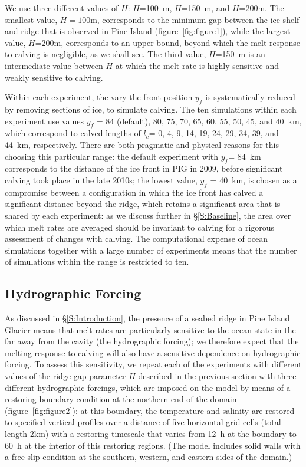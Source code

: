 \documentclass[draft]{agujournal2019}
\begin{document}
We use three different values of $H$: $H$=100~m, $H$=150~m, and $H$=200m. The smallest value, $H = 100$m, corresponds to the minimum gap between the ice shelf and ridge that is observed in Pine Island (figure~\ref{fig:figure1}), while the largest value, $H$=200m, corresponds to an upper bound, beyond which the melt response to calving is negligible, as we shall see. The third value, $H$=150~m is an intermediate value between $H$ at which the melt rate is highly sensitive and weakly sensitive to calving.

Within each experiment, the vary the front position $y_f$ is systematically reduced by removing sections of ice, to simulate calving. The ten simulations within each experiment use values $y_f$ = 84 (default), 80, 75, 70, 65, 60, 55, 50, 45, and 40~km, which correspond to calved lengths of $l_c$= 0, 4, 9, 14, 19, 24, 29, 34, 39, and 44~km, respectively. There are both pragmatic and physical reasons for this choosing this particular range: the default experiment with $y_f$= 84~km corresponds to the distance of the ice front in PIG in 2009, before significant calving took place in the late 2010s; the lowest value, $y_f$ = 40~km, is chosen as a compromise between a configuration in which the ice front has calved a significant distance beyond the ridge, which retains a significant area that is shared by each experiment: as we discuss further in \S\ref{S:Baseline}, the area over which melt rates are averaged should be invariant to calving for a rigorous assessment of changes with calving. The computational expense of ocean simulations together with a large number of experiments means that the number of simulations within the range is restricted to ten.

\subsection{Hydrographic Forcing}\label{S:Experiment:Hydrography}

As discussed in \S\ref{S:Introduction}, the presence of a seabed ridge in Pine Island Glacier means that melt rates are particularly sensitive to the ocean state in the far away from the cavity (the hydrographic forcing); we therefore expect that the melting response to calving will also have a sensitive dependence on hydrographic forcing. To assess this sensitivity, we repeat each of the experiments with different values of the ridge-gap parameter $H$ described in the previous section with three different hydrographic forcings, which are imposed on the model by means of a restoring boundary condition at the northern end of the domain (figure~\ref{fig:figure2}): at this boundary, the temperature and salinity are restored to specified vertical profiles over a distance of five horizontal grid cells (total length 2km) with a restoring timescale that varies from 12~h at the boundary to 60~h at the interior of this restoring regions. (The model includes solid walls with a free slip condition at the southern, western, and eastern sides of the domain.)
\end{document}
